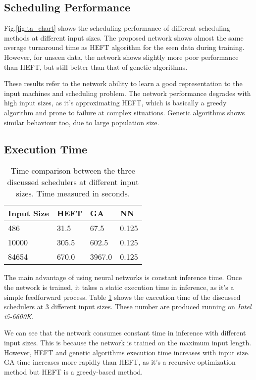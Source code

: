 \subsection{Scheduling Performance}

Fig.\ref{fig:ta_chart} shows the scheduling performance of different scheduling methods at different input sizes. The proposed network shows almost the same average turnaround time as HEFT algorithm for the seen data during training. However, for unseen data, the network shows slightly more poor performance than HEFT, but still better than that of genetic algorithms. 

These results refer to the network ability to learn a good representation to the input machines and scheduling problem. The network performance degrades with high input sizes, as it's approximating HEFT, which is basically a greedy algorithm and prone to failure at complex situations. Genetic algorithms shows similar behaviour too, due to large population size.

\subsection{Execution Time}
\begin{table}
  \caption{Time comparison between the three discussed schedulers at different input sizes. Time measured in seconds.}
  \label{tab:exec_time}
  \centering
  \begin{tabular}{l l l l}
    \toprule
    Input Size & HEFT & GA & NN \\
    \midrule
    486	& 31.5 & 67.5 & 0.125 \\
    10000 & 305.5 & 602.5 & 0.125 \\
    84654 & 670.0 & 3967.0 & 0.125 \\
    \bottomrule
  \end{tabular}
\end{table}

The main advantage of using neural networks is constant inference time. Once the network is trained, it takes a static execution time in inference, as it's a simple feedforward process. Table \ref{tab:exec_time} shows the execution time of the discussed schedulers at 3 different input sizes. These number are produced running on \emph{Intel i5-6600K}. 

We can see that the network consumes constant time in inference with different input sizes. This is because the network is trained on the maximum input length. However, HEFT and genetic algorithms execution time increases with input size. GA time increases more rapidly than HEFT, as it's a recursive optimization method but HEFT is a greedy-based method.

